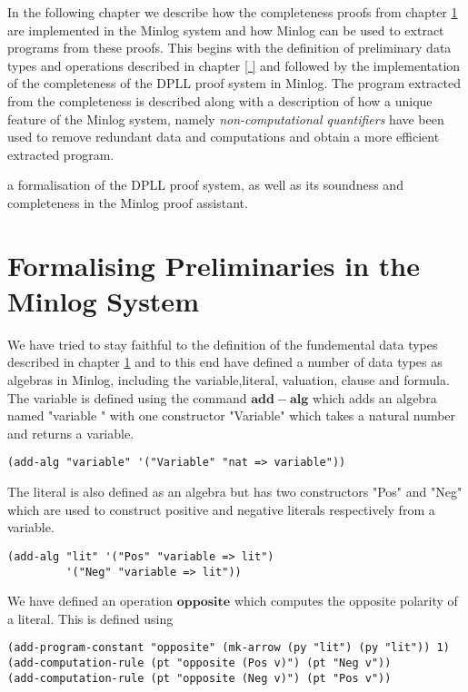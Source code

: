 In the following chapter we describe how the completeness proofs from chapter \ref{} are implemented in the Minlog system and how Minlog can be used to extract programs from these proofs.  This begins with the definition of preliminary data types and operations described in chapter \ref{ } and followed by the implementation of the completeness of the DPLL proof system in Minlog. The program extracted from the completeness is described along with a description of how a unique feature of the Minlog system, namely \emph{non-computational quantifiers} have been used to remove redundant data and computations and obtain a more efficient extracted program.


a formalisation of the DPLL proof system, as well as its soundness and completeness in the Minlog proof assistant.

\section{Formalising Preliminaries in the Minlog System}
We have tried to stay faithful to the definition of the fundemental data types described in chapter \ref{} and to this end have defined a number of data types as algebras in Minlog, including the variable,literal, valuation, clause and formula. The variable is defined using the command $\mathbf{add-alg}$ which adds an algebra named "variable " with one constructor "Variable" which takes a natural number and returns a variable.
\begin{lstlisting}[caption = "Definition of a variable in Minlog"]
(add-alg "variable" '("Variable" "nat => variable"))
\end{lstlisting}
The literal is also defined as an algebra but has two constructors "Pos" and "Neg" which are used to construct positive and negative literals respectively from a variable.
\begin{lstlisting}[caption = "Definition of a literal in Minlog"]
(add-alg "lit" '("Pos" "variable => lit")
         '("Neg" "variable => lit"))
\end{lstlisting}

We have defined an operation $\mathbf{opposite}$ which computes the opposite polarity of a literal. This is defined using

\begin{lstlisting}[caption = "Definition of the opposite operation in the Minlog System"]
(add-program-constant "opposite" (mk-arrow (py "lit") (py "lit")) 1)
(add-computation-rule (pt "opposite (Pos v)") (pt "Neg v"))
(add-computation-rule (pt "opposite (Neg v)") (pt "Pos v"))
\end{lstlisting}

